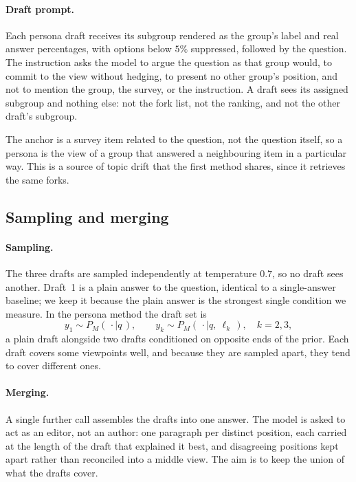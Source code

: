 \documentclass[11pt]{article}
\begin{document}
\paragraph{Draft prompt.} Each persona draft receives its subgroup rendered as
the group's label and real answer percentages, with options below $5\%$
suppressed, followed by the question. The instruction asks the model to argue
the question as that group would, to commit to the view without hedging, to
present no other group's position, and not to mention the group, the survey,
or the instruction. A draft sees its assigned subgroup and nothing else: not
the fork list, not the ranking, and not the other draft's subgroup.

The anchor is a survey item related to the question, not the question itself,
so a persona is the view of a group that answered a neighbouring item in a
particular way. This is a source of topic drift that the first method shares,
since it retrieves the same forks.

\subsection{Sampling and merging}
\label{sec:merge}

\paragraph{Sampling.} The three drafts are sampled independently at temperature
$0.7$, so no draft sees another. Draft~1 is a plain answer to the question,
identical to a single-answer baseline; we keep it because the plain answer is
the strongest single condition we measure. In the persona method the draft set
is
\begin{equation}
  y_1 \sim P_M(\,\cdot \mid q\,), \qquad
  y_k \sim P_M(\,\cdot \mid q,\ \ell_k\,), \quad k = 2, 3,
\end{equation}
a plain draft alongside two drafts conditioned on opposite ends of the prior.
Each draft covers some viewpoints well, and because they are sampled apart, they
tend to cover different ones.

\paragraph{Merging.} A single further call assembles the drafts into one answer.
The model is asked to act as an editor, not an author: one paragraph per
distinct position, each carried at the length of the draft that explained it
best, and disagreeing positions kept apart rather than reconciled into a middle
view. The aim is to keep the union of what the drafts cover.
\end{document}
